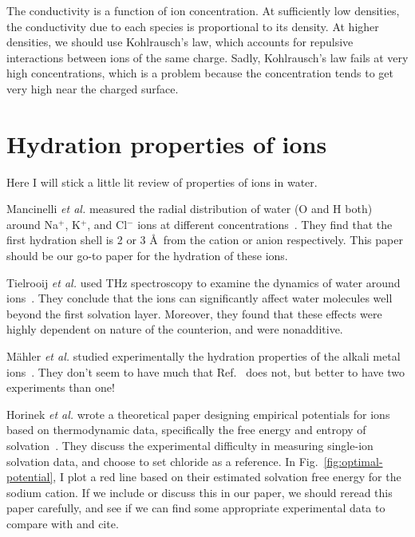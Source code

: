 \documentclass[twocolumn]{revtex4-1}
\begin{document}
The conductivity is a function of ion concentration.  At sufficiently
low densities, the conductivity due to each species is proportional to
its density.  At higher densities, we should use Kohlrausch's law,
which accounts for repulsive interactions between ions of the same
charge.  Sadly, Kohlrausch's law fails at very high concentrations,
which is a problem because the concentration tends to get very high
near the charged surface.

\section{Hydration properties of ions}
Here I will stick a little lit review of properties of ions in water.

Mancinelli \emph{et al.} measured the radial distribution of water (O
and H both) around Na$^+$, K$^+$, and Cl$^-$ ions at different
concentrations~\cite{mancinelli2007hydration}.  They find that the
first hydration shell is 2 or 3 \AA\ from the cation or anion
respectively.  This paper should be our go-to paper for the hydration
of these ions.

Tielrooij \emph{et al.} used THz spectroscopy to examine the dynamics
of water around ions~\cite{tielrooij2010cooperativity}.  They conclude
that the ions can significantly affect water molecules well beyond the
first solvation layer.  Moreover, they found that these effects were
highly dependent on nature of the counterion, and were nonadditive.

M\"ahler \emph{et al.} studied experimentally the hydration properties
of the alkali metal ions~\cite{mahler2011study}.  They don't seem to
have much that Ref.~ does not, but
better to have two experiments than one!

Horinek \emph{et al.} wrote a theoretical paper designing empirical
potentials for ions based on thermodynamic data, specifically the free
energy and entropy of solvation~\cite{horinek2009rational}.  They
discuss the experimental difficulty in measuring single-ion solvation
data, and choose to set chloride as a reference.  In
Fig.~\ref{fig:optimal-potential}, I plot a red line based on their
estimated solvation free energy for the sodium cation.  If we include
or discuss this in our paper, we should reread this paper carefully,
and see if we can find some appropriate experimental data to compare
with and cite.



\end{document}
